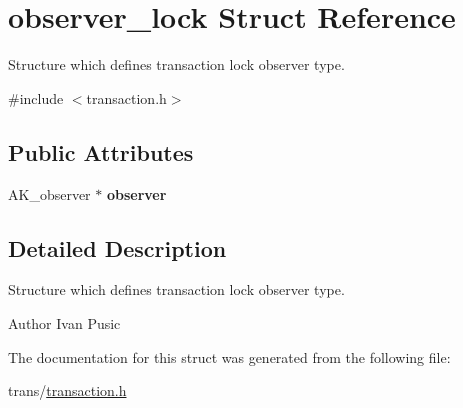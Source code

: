 \hypertarget{structobserver__lock}{\section{observer\+\_\+lock Struct Reference}
\label{structobserver__lock}
}


Structure which defines transaction lock observer type.  




{\ttfamily \#include $<$transaction.\+h$>$}

\subsection*{Public Attributes}
\begin{DoxyCompactItemize}
\item 
\hypertarget{structobserver__lock_a50392f80cd7b7915056d44a49013f190}{A\+K\+\_\+observer $\ast$ {\bfseries observer}}\label{structobserver__lock_a50392f80cd7b7915056d44a49013f190}

\end{DoxyCompactItemize}


\subsection{Detailed Description}
Structure which defines transaction lock observer type. 

\begin{DoxyAuthor}{Author}
Ivan Pusic 
\end{DoxyAuthor}


The documentation for this struct was generated from the following file\+:\begin{DoxyCompactItemize}
\item 
trans/\hyperlink{transaction_8h}{transaction.\+h}\end{DoxyCompactItemize}
